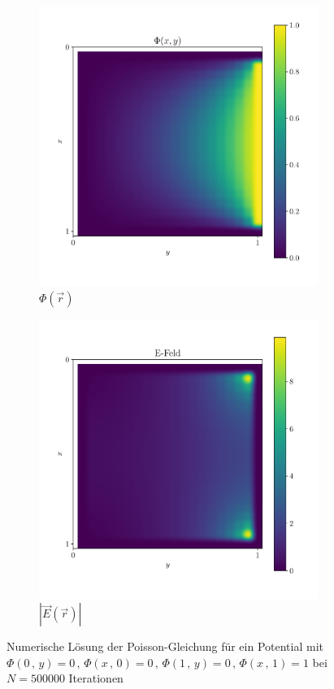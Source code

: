 \begin{figure}[H]
    \centering
    \begin{subfigure}[b]{0.45\textwidth}
        \includegraphics[width=\textwidth]{Abbildungen/Phi_b.pdf}
           \caption{$\Phi\left(\vec{r}\right)$}
   \end{subfigure}
     \begin{subfigure}[b]{0.45\textwidth}
        \includegraphics[width=\textwidth]{Abbildungen/E_b.pdf}
           \caption{$\left|\vec{E}\left(\vec{r}\right)\right|$}
   \end{subfigure}
   \caption{Numerische Lösung der Poisson-Gleichung für ein Potential mit $\Phi\left(0\,,\,y\right)=0\,,\,
\Phi\left(x\,,\,0\right)=0\,,\,
\Phi\left(1\,,\,y\right)=0\,,\,
\Phi\left(x\,,\,1\right)=1$ bei
   $N=500000$ Iterationen  }\label{b}
   \end{figure}\noindent
